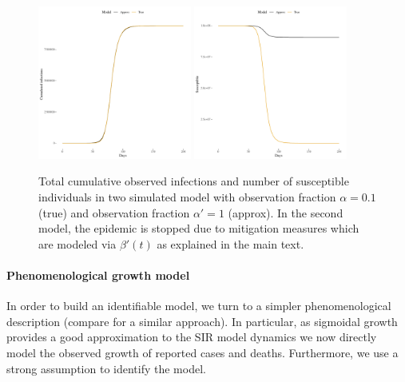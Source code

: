 \documentclass[a4paper]{tufte-handout}
\begin{document}
\begin{figure}
  \includegraphics[width=0.45\textwidth]{../figs/approx_infect.pdf}
  \includegraphics[width=0.45\textwidth]{../figs/approx_suscept.pdf}
  \caption{\label{fig:SIRapprox} Total cumulative observed infections
    and number of susceptible individuals in two simulated model with
    observation fraction $\alpha = 0.1$ (true) and observation
    fraction $\alpha' = 1$ (approx). In the second model, the epidemic
    is stopped due to mitigation measures which are modeled via
    $\beta'(t)$ as explained in the main text.}
\end{figure}

\paragraph{Phenomenological growth model}
In order to build an identifiable model, we turn to a simpler
phenomenological description (compare \cite{kubinec} for a similar
approach). In particular, as sigmoidal growth provides a good
approximation to the SIR model dynamics we now directly model the
observed growth of reported cases and deaths. Furthermore, we use a
strong assumption to identify the model.
\end{document}
